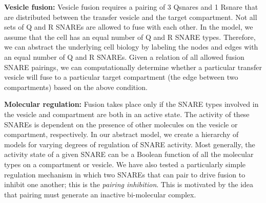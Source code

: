 \textbf{Vesicle fusion:}
%
% 
%
%  
%
%
Vesicle fusion requires a pairing of 3 Qsnares and 1 Rsnare that are distributed between the transfer vesicle and the target compartment. 
%
%
Not all sets of Q and R SNAREs are allowed to fuse with each other.
%
In the model, we assume that the cell has an equal number of Q and R SNARE types.
%
Therefore, we can abstract the underlying cell biology by labeling the nodes and edges with an equal number of Q and R SNAREs. 
%
%
Given a relation of all allowed fusion SNARE pairings, we can computationally determine whether a particular transfer vesicle will fuse to a particular target compartment (the edge between two compartments) based on the above condition.  

\textbf{Molecular regulation:} 
Fusion takes place only if the SNARE types involved in the vesicle and compartment are both in an active state.
%
The activity of these SNAREs is dependent on the presence of other molecules on the vesicle or compartment, respectively.
%
In our abstract model, 
we create a hierarchy of models for varying degrees of regulation of SNARE activity.
%
Most generally, the activity state of a given SNARE can be a Boolean function of all the molecular types on a compartment or vesicle. 
%
We have also tested \cite{shukla} a particularly simple regulation mechanism in which two SNAREs that can pair to drive fusion to inhibit one another; this is the \textit{pairing inhibition}. 
%
This is motivated by the idea that pairing must generate an inactive bi-molecular complex.
%

